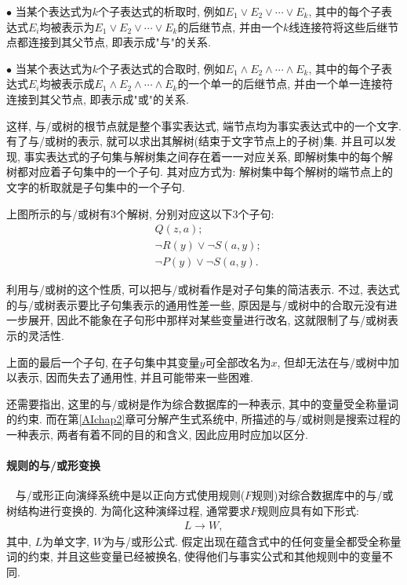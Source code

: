 \begin{example}
$\bullet$ 当某个表达式为$k$个子表达式的析取时, 例如$E_1\vee E_2\vee \cdots \vee E_k$, 其中的每个子表达式$E_i$均被表示为$E_1\vee E_2\vee \cdots \vee E_k$的后继节点, 并由一个$k$线连接符将这些后继节点都连接到其父节点, 即表示成"与"的关系.

$\bullet$ 当某个表达式为$k$个子表达式的合取时, 例如$E_1\wedge E_2\wedge \cdots \wedge E_k$, 其中的每个子表达式$E_i$均被表示成$E_1\wedge E_2\wedge \cdots \wedge E_k$的一个单一的后继节点, 并由一个单一连接符连接到其父节点, 即表示成"或"的关系.

这样, 与/或树的根节点就是整个事实表达式, 端节点均为事实表达式中的一个文字. 有了与/或树的表示, 就可以求出其解树(结束于文字节点上的子树)集. 并且可以发现, 事实表达式的子句集与解树集之间存在着一一对应关系, 即解树集中的每个解树都对应着子句集中的一个子句.
其对应方式为: 解树集中每个解树的端节点上的文字的析取就是子句集中的一个子句.

上图所示的与/或树有3个解树, 分别对应这以下3个子句:
\begin{align*}
    &Q(z, a);\\
    &\neg R(y)\vee  \neg  S(a, y);\\
    &\neg P(y)\vee  \neg  S(a, y).
\end{align*}
\end{example}

利用与/或树的这个性质, 可以把与/或树看作是对子句集的简洁表示. 不过, 表达式的与/或树表示要比子句集表示的通用性差一些, 原因是与/或树中的合取元没有进一步展开, 因此不能象在子句形中那样对某些变量进行改名, 这就限制了与/或树表示的灵活性.
\begin{example}
    上面的最后一个子句, 在子句集中其变量$y$可全部改名为$x$, 但却无法在与/或树中加以表示, 因而失去了通用性, 并且可能带来一些困难.
\end{example}

还需要指出, 这里的与/或树是作为综合数据库的一种表示, 其中的变量受全称量词的约束. 而在第\ref{AIchap2}章可分解产生式系统中, 所描述的与/或树则是搜索过程的一种表示, 两者有着不同的目的和含义, 因此应用时应加以区分.
\paragraph{规则的与/或形变换}~{}
与/或形正向演绎系统中是以正向方式使用规则($F$规则)对综合数据库中的与/或树结构进行变换的. 为简化这种演绎过程, 通常要求$F$规则应具有如下形式:
\begin{align}
    L\rightarrow W,
\end{align}
其中, $L$为单文字, $W$为与/或形公式. 假定出现在蕴含式中的任何变量全都受全称量词的约束, 并且这些变量已经被换名, 使得他们与事实公式和其他规则中的变量不同.


